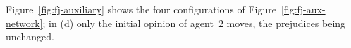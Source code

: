 Figure~\ref{fig:fj-auxiliary} shows the four configurations of
Figure~\ref{fig:fj-aux-network}; in (d) only the initial opinion of agent~$2$ moves, the
prejudices being unchanged.

